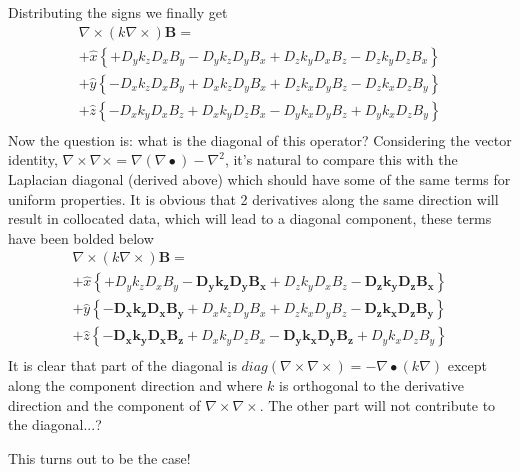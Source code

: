 \documentclass[11pt]{article}
\begin{document}
Distributing the signs we finally get
\begin{multline}
  \nabla \times (k \nabla \times) \mathbf{B} = \\
  +\hat{x} \left\{ +D_y k_z D_x B_y - D_y k_z D_y B_x +  D_z k_y D_x B_z - D_z k_y D_z B_x \right\} \\
  +\hat{y} \left\{ -D_x k_z D_x B_y + D_x k_z D_y B_x +  D_z k_x D_y B_z - D_z k_x D_z B_y \right\} \\
  +\hat{z} \left\{ -D_x k_y D_x B_z + D_x k_y D_z B_x -  D_y k_x D_y B_z + D_y k_x D_z B_y \right\} \\
\end{multline}
Now the question is: what is the diagonal of this operator? Considering the vector identity, $\nabla \times \nabla \times = \nabla (\nabla \bullet ) - \nabla^2$, it's natural to compare this with the Laplacian diagonal (derived above) which should have some of the same terms for uniform properties. It is obvious that 2 derivatives along the same direction will result in collocated data, which will lead to a diagonal component, these terms have been bolded below
\begin{multline}
  \nabla \times (k \nabla \times) \mathbf{B} = \\
  +\hat{x} \left\{ +D_y k_z D_x B_y - \mathbf{D_y k_z D_y B_x} + D_z k_y D_x B_z - \mathbf{D_z k_y D_z B_x} \right\} \\
  +\hat{y} \left\{ -\mathbf{D_x k_z D_x B_y} + D_x k_z D_y B_x + D_z k_x D_y B_z - \mathbf{D_z k_x D_z B_y} \right\} \\
  +\hat{z} \left\{ -\mathbf{D_x k_y D_x B_z} + D_x k_y D_z B_x - \mathbf{D_y k_x D_y B_z} + D_y k_x D_z B_y \right\} \\
\end{multline}
It is clear that part of the diagonal is $diag(\nabla \times \nabla \times) = -\nabla \bullet (k \nabla)$ except along the component direction and where $k$ is orthogonal to the derivative direction and the component of $\nabla \times \nabla \times$. The other part will not contribute to the diagonal...?

This turns out to be the case!
\end{document}
